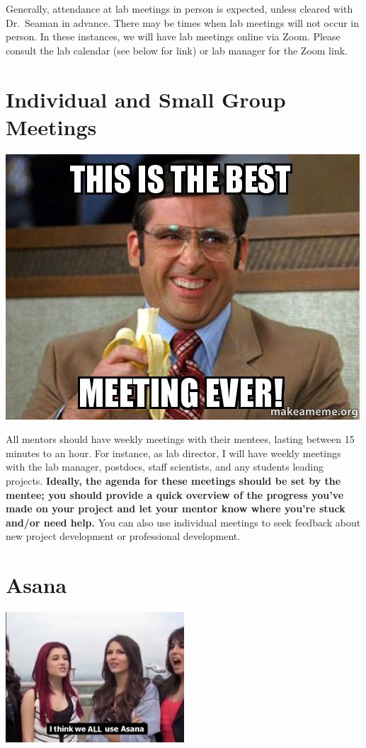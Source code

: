 \documentclass[]{book}
\begin{document}
Generally, attendance at lab meetings in person is expected, unless cleared with Dr.~Seaman in advance. There may be times when lab meetings will not occur in person. In these instances, we will have lab meetings online via Zoom. Please consult the lab calendar (see below for link) or lab manager for the Zoom link.

\hypertarget{individual-and-small-group-meetings}{%
\section{Individual and Small Group Meetings}\label{individual-and-small-group-meetings}}

\includegraphics{images/best_meeting.jpg}

All mentors should have weekly meetings with their mentees, lasting between 15 minutes to an hour. For instance, as lab director, I will have weekly meetings with the lab manager, postdocs, staff scientists, and any students leading projects. \textbf{Ideally, the agenda for these meetings should be set by the mentee; you should provide a quick overview of the progress you've made on your project and let your mentor know where you're stuck and/or need help.} You can also use individual meetings to seek feedback about new project development or professional development.

\hypertarget{asana}{%
\section{Asana}\label{asana}}

\includegraphics[width=0.5\textwidth,height=\textheight]{images/i_think_we_all.jpg}
\end{document}
